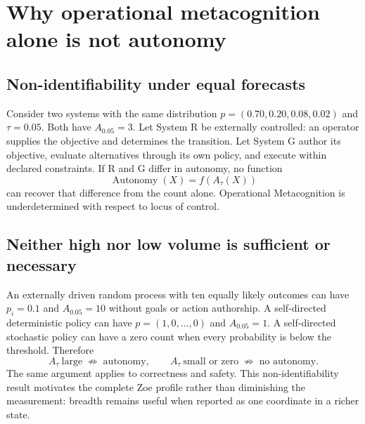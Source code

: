 \section{Why operational metacognition alone is not autonomy}
\subsection{Non-identifiability under equal forecasts}
Consider two systems with the same distribution $p=(0.70,0.20,0.08,0.02)$ and $\tau=0.05$. Both have $A_{0.05}=3$. Let System R be externally controlled: an operator supplies the objective and determines the transition. Let System G author its objective, evaluate alternatives through its own policy, and execute within declared constraints. If R and G differ in autonomy, no function
\begin{equation}
\operatorname{Autonomy}(X)=f\!\left(A_\tau(X)\right)
\label{eq:no-volume-only-autonomy}
\end{equation}
can recover that difference from the count alone. Operational Metacognition is underdetermined with respect to locus of control.

\subsection{Neither high nor low volume is sufficient or necessary}
An externally driven random process with ten equally likely outcomes can have
$p_i=0.1$ and $A_{0.05}=10$ without goals or action authorship. A self-directed deterministic policy can have $p=(1,0,\ldots,0)$ and $A_{0.05}=1$. A self-directed stochastic policy can have a zero count when every probability is below the threshold. Therefore
\begin{equation}
A_\tau\ \text{large}\;\not\Rightarrow\;\text{autonomy},\qquad
A_\tau\ \text{small or zero}\;\not\Rightarrow\;\text{no autonomy}.
\label{eq:autonomy-counterexamples}
\end{equation}
The same argument applies to correctness and safety. This non-identifiability result motivates the complete Zoe profile rather than diminishing the measurement: breadth remains useful when reported as one coordinate in a richer state.

